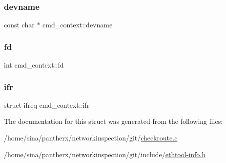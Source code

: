 \mbox{\label{structcmd__context_ab8b7bd55de702a0928b0d27b7d7f46c4}} 
\subsubsection{\texorpdfstring{devname}{devname}}
{\footnotesize\ttfamily const char $\ast$ cmd\+\_\+context\+::devname}

\mbox{\label{structcmd__context_a3482941a7d95d94958fd026e984aaad6}} 
\subsubsection{\texorpdfstring{fd}{fd}}
{\footnotesize\ttfamily int cmd\+\_\+context\+::fd}

\mbox{\label{structcmd__context_a372549b7e45b707f07780719bc9f3b06}} 
\subsubsection{\texorpdfstring{ifr}{ifr}}
{\footnotesize\ttfamily struct ifreq cmd\+\_\+context\+::ifr}



The documentation for this struct was generated from the following files\+:\begin{DoxyCompactItemize}
\item 
/home/sina/pantherx/networkinspection/git/\hyperlink{checkroute_8c}{checkroute.\+c}\item 
/home/sina/pantherx/networkinspection/git/include/\hyperlink{ethtool-info_8h}{ethtool-\/info.\+h}\end{DoxyCompactItemize}

